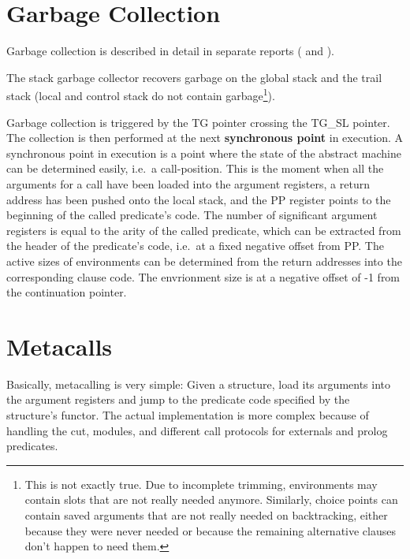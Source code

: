 \section{Garbage Collection}

Garbage collection is described in detail in separate reports
(\cite{gc90} and \cite{gcint90}).

The stack garbage collector recovers garbage on the global stack
and the trail stack (local and control stack do not contain
garbage\footnote{
This is not exactly true. Due to incomplete trimming, environments
may contain slots that are not really needed anymore. Similarly,
choice points can contain saved arguments that are not really needed
on backtracking, either because they were never needed or because
the remaining alternative clauses don't happen to need them.}).

Garbage collection is triggered by the TG pointer crossing the
TG_SL pointer. The collection is then performed at the next
{\bf synchronous point} in execution.
A synchronous point in execution is a point where the state of the
abstract machine can be determined easily, i.e.\ a call-position.
This is the moment when all the arguments for a call have been loaded
into the argument registers, a return address has been pushed onto
the local stack, and the PP register points to the beginning of the
called predicate's code. The number of significant argument registers
is equal to the arity of the called predicate, which can be extracted
from the header of the predicate's code, i.e.\ at a fixed negative
offset from PP. The active sizes of environments can be determined
from the return addresses into the corresponding clause code.
The envrionment size is at a negative offset of -1 from the
continuation pointer.


\section{Metacalls}
\label{metacall}

Basically, metacalling is very simple:  Given a structure, load its
arguments into the argument registers and jump to the predicate code
specified by the structure's functor.  The actual implementation is
more complex because of handling the cut, modules, and different call
protocols for externals and prolog predicates.

